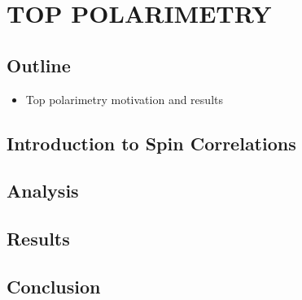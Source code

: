 \begingroup
\clearpage%
\let\clearpage\relax%
\vspace*{-16pt}%
\chapter[TOP POLARIMETRY]{TOP POLARIMETRY}
\endgroup

\section{Outline}

\begin{itemize}
  \item Top polarimetry motivation and results
\end{itemize}

\section{Introduction to Spin Correlations}

\lipsum[1]

\section{Analysis}

\lipsum[1]

\section{Results}

\lipsum[1]

\section{Conclusion}

\lipsum[1]


